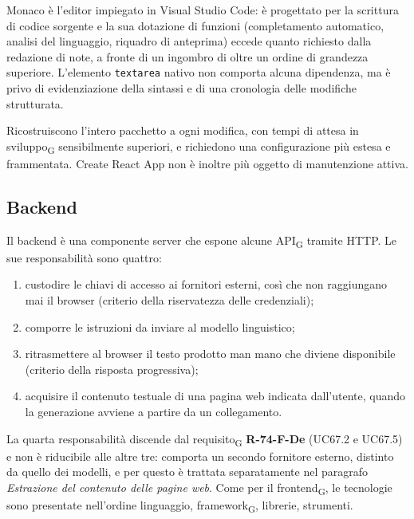 \documentclass[a4paper, 10pt]{article}
\newenvironment{alternative}{%
  \begin{description}[
    style=nextline,
    leftmargin=0pt,
    labelindent=0pt,
    labelsep=0pt,
    font=\normalfont\bfseries,
    topsep=0.6em,
    itemsep=0.9em,
    parsep=0pt
  ]%
}{%
  \end{description}%
}
\newcommand{\altitem}[1]{\item[\textbullet\enspace #1]}
\begin{document}
\begin{alternative}
\altitem{Monaco e \texttt{textarea} nativa al posto di CodeMirror}
Monaco è l'editor impiegato in Visual Studio Code: è progettato per la scrittura di codice sorgente e la sua dotazione di funzioni (completamento automatico, analisi del linguaggio, riquadro di anteprima) eccede quanto richiesto dalla redazione di note, a fronte di un ingombro di oltre un ordine di grandezza superiore. L'elemento \texttt{textarea} nativo non comporta alcuna dipendenza, ma è privo di evidenziazione della sintassi e di una cronologia delle modifiche strutturata.

\altitem{Webpack e Create React App al posto di Vite}
Ricostruiscono l'intero pacchetto a ogni modifica, con tempi di attesa in sviluppo\textsubscript{G} sensibilmente superiori, e richiedono una configurazione più estesa e frammentata. Create React App non è inoltre più oggetto di manutenzione attiva.

\end{alternative}

\subsection{Backend}
\label{sec:tecnologie-backend}
Il backend è una componente server che espone alcune API\textsubscript{G} tramite HTTP. Le sue responsabilità sono quattro:

\begin{enumerate}
    \setlength{\itemsep}{0pt}
    \item custodire le chiavi di accesso ai fornitori esterni, così che non raggiungano mai il browser (criterio della riservatezza delle credenziali);
    \item comporre le istruzioni da inviare al modello linguistico;
    \item ritrasmettere al browser il testo prodotto man mano che diviene disponibile (criterio della risposta progressiva);
    \item acquisire il contenuto testuale di una pagina web indicata dall'utente, quando la generazione avviene a partire da un collegamento.
\end{enumerate}

\noindent La quarta responsabilità discende dal requisito\textsubscript{G} \textbf{R-74-F-De} (UC67.2 e UC67.5) e non è riducibile alle altre tre: comporta un secondo fornitore esterno, distinto da quello dei modelli, e per questo è trattata separatamente nel paragrafo \textit{Estrazione del contenuto delle pagine web}. Come per il frontend\textsubscript{G}, le tecnologie sono presentate nell'ordine linguaggio, framework\textsubscript{G}, librerie, strumenti.
\end{document}
